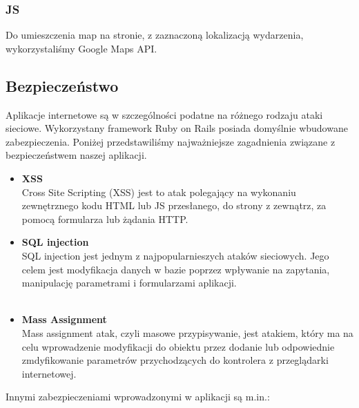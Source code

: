       \subsubsection{JS}
      Do umieszczenia map na stronie, z zaznaczoną lokalizacją wydarzenia, wykorzystaliśmy Google Maps API.

      

    \subsection{Bezpieczeństwo}
    Aplikacje internetowe są w szczególności podatne na różnego rodzaju ataki sieciowe. Wykorzystany framework Ruby on Rails posiada domyślnie wbudowane zabezpieczenia. Poniżej przedstawiliśmy najważniejsze zagadnienia związane z bezpieczeństwem naszej aplikacji.
      \begin{itemize}
        \item \textbf{XSS}\\ 
        Cross Site Scripting (XSS) jest to atak polegający na wykonaniu zewnętrznego kodu HTML lub JS przesłanego, do strony z zewnątrz, za pomocą formularza lub żądania HTTP.

        

        \item \textbf{SQL injection}\\ 
        SQL injection jest jednym z najpopularnieszych ataków sieciowych. Jego celem jest modyfikacja danych w bazie poprzez wpływanie na zapytania, manipulację parametrami i formularzami aplikacji.\\\\
        

        \item \textbf{Mass Assignment} \\ 
        Mass assignment atak, czyli masowe przypisywanie, jest atakiem, który ma na celu wprowadzenie modyfikacji do obiektu przez dodanie lub odpowiednie zmdyfikowanie parametrów przychodzących do kontrolera z przeglądarki internetowej.\\
        
      \end{itemize}
    Innymi zabezpieczeniami wprowadzonymi w aplikacji są m.in.:
